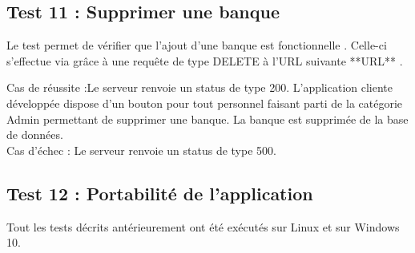 \subsection{Test 11 : Supprimer une banque}

Le test permet de vérifier que l'ajout d'une banque est fonctionnelle .
Celle-ci s'effectue via grâce à une requête de type DELETE à l'URL suivante **URL** .

Cas de réussite :Le serveur renvoie un status de type 200.
L'application cliente développée dispose d'un bouton pour tout personnel faisant parti de la catégorie Admin permettant de supprimer une banque. La banque est supprimée de la base de données.
\\
Cas d'échec : Le serveur renvoie un status de type 500.

\subsection{Test 12 : Portabilité de l'application}

Tout les tests décrits antérieurement ont été exécutés sur  Linux et sur Windows 10.